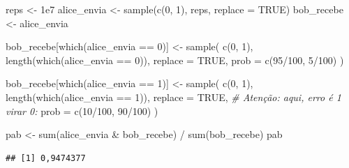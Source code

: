 \documentclass[
  11pt]{report}
\newenvironment{Shaded}{\begin{snugshade}}{\end{snugshade}}
\newcommand{\AttributeTok}[1]{\textcolor[rgb]{0.77,0.63,0.00}{#1}}
\newcommand{\CommentTok}[1]{\textcolor[rgb]{0.56,0.35,0.01}{\textit{#1}}}
\newcommand{\ConstantTok}[1]{\textcolor[rgb]{0.00,0.00,0.00}{#1}}
\newcommand{\DecValTok}[1]{\textcolor[rgb]{0.00,0.00,0.81}{#1}}
\newcommand{\FloatTok}[1]{\textcolor[rgb]{0.00,0.00,0.81}{#1}}
\newcommand{\FunctionTok}[1]{\textcolor[rgb]{0.00,0.00,0.00}{#1}}
\newcommand{\NormalTok}[1]{#1}
\newcommand{\OtherTok}[1]{\textcolor[rgb]{0.56,0.35,0.01}{#1}}
\newcommand{\SpecialCharTok}[1]{\textcolor[rgb]{0.00,0.00,0.00}{#1}}
\renewenvironment{Shaded}{
    \begin{mdframed}[%
      roundcorner=2pt,%
      innerleftmargin=5pt,%
      innerrightmargin=5pt,%
      topline=true,%
      leftline=true,%
      rightline=true,%
      bottomline=true,%
      linewidth=0.5pt,%
      linecolor=black!20,%
      backgroundcolor=black!2,%
      skipabove=2ex,%
      skipbelow=2.5ex%
    ]%
  }
  {
    \end{mdframed}
  }
\begin{document}
\begin{itemize}
\begin{Shaded}
\begin{Highlighting}[]
\NormalTok{reps }\OtherTok{\textless{}{-}} \FloatTok{1e7}
\NormalTok{alice\_envia }\OtherTok{\textless{}{-}} \FunctionTok{sample}\NormalTok{(}\FunctionTok{c}\NormalTok{(}\DecValTok{0}\NormalTok{, }\DecValTok{1}\NormalTok{), reps, }\AttributeTok{replace =} \ConstantTok{TRUE}\NormalTok{)}
\NormalTok{bob\_recebe }\OtherTok{\textless{}{-}}\NormalTok{ alice\_envia}

\NormalTok{bob\_recebe[}\FunctionTok{which}\NormalTok{(alice\_envia }\SpecialCharTok{==} \DecValTok{0}\NormalTok{)] }\OtherTok{\textless{}{-}} 
  \FunctionTok{sample}\NormalTok{(}
    \FunctionTok{c}\NormalTok{(}\DecValTok{0}\NormalTok{, }\DecValTok{1}\NormalTok{), }
    \FunctionTok{length}\NormalTok{(}\FunctionTok{which}\NormalTok{(alice\_envia }\SpecialCharTok{==} \DecValTok{0}\NormalTok{)),}
    \AttributeTok{replace =} \ConstantTok{TRUE}\NormalTok{,}
    \AttributeTok{prob =} \FunctionTok{c}\NormalTok{(}\DecValTok{95}\SpecialCharTok{/}\DecValTok{100}\NormalTok{, }\DecValTok{5}\SpecialCharTok{/}\DecValTok{100}\NormalTok{)}
\NormalTok{  )}

\NormalTok{bob\_recebe[}\FunctionTok{which}\NormalTok{(alice\_envia }\SpecialCharTok{==} \DecValTok{1}\NormalTok{)] }\OtherTok{\textless{}{-}} 
  \FunctionTok{sample}\NormalTok{(}
    \FunctionTok{c}\NormalTok{(}\DecValTok{0}\NormalTok{, }\DecValTok{1}\NormalTok{), }
    \FunctionTok{length}\NormalTok{(}\FunctionTok{which}\NormalTok{(alice\_envia }\SpecialCharTok{==} \DecValTok{1}\NormalTok{)),}
    \AttributeTok{replace =} \ConstantTok{TRUE}\NormalTok{,}
    \CommentTok{\# Atenção: aqui, erro é 1 virar 0:}
    \AttributeTok{prob =} \FunctionTok{c}\NormalTok{(}\DecValTok{10}\SpecialCharTok{/}\DecValTok{100}\NormalTok{, }\DecValTok{90}\SpecialCharTok{/}\DecValTok{100}\NormalTok{)  }
\NormalTok{  )}

\NormalTok{pab }\OtherTok{\textless{}{-}} \FunctionTok{sum}\NormalTok{(alice\_envia }\SpecialCharTok{\&}\NormalTok{ bob\_recebe) }\SpecialCharTok{/} \FunctionTok{sum}\NormalTok{(bob\_recebe)}
\NormalTok{pab}
\end{Highlighting}
\end{Shaded}

\begin{verbatim}
## [1] 0,9474377
\end{verbatim}
\end{itemize}
\end{document}
